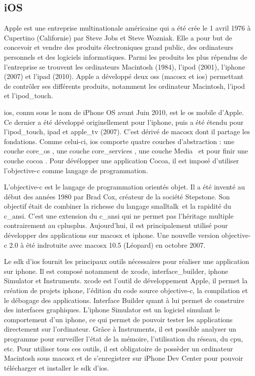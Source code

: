 \subsection{iOS}
	Apple est une entreprise multinationale américaine qui a été crée le 1
	avril 1976 à Cupertino (Californie) par Steve Jobs et Steve Wozniak. Elle a
	pour but de concevoir et vendre des produits électroniques grand public, des
	ordinateurs personnels et des logiciels informatiques. Parmi les produits les
	plus répendus de l'entreprise se trouvent les ordinateurs Macintosh (1984),
	l'\gls{ipod} (2001), l'\gls{iphone} (2007) et l'\gls{ipad} (2010). Apple a
	développé deux \glspl{os} (\gls{macosx} et \gls{ios})
	permettant de contrôler ses différents produits, notamment les ordinateur 
	Macintosh, l'\gls{ipod} et l'\gls{ipod_touch}.
			
	\gls{ios}, connu sous le nom de iPhone OS avant Juin 2010, est le \gls{os} 
	mobile d'Apple. Ce dernier a été développé originellement pour l'\gls{iphone}, puis a été étendu pour l'\gls{ipod_touch}, \gls{ipad} et
	\gls{apple_tv} (2007). C'est dérivé de \gls{macosx}  dont il partage les 
	fondations. Comme celui-ci, \gls{ios} comporte quatre couches d'abstraction : une
	couche \og \gls{core_os} \fg, une couche \og \gls{core_services} \fg, une
	couche \og Media \fg \, et pour finir une couche \og \gls{cocoa} \fg. Pour
	dévélopper une application Cocoa, il est imposé d'utiliser l'\gls{objective-c} comme
	langage de programmation.
			
	L'\gls{objective-c} est le langage de programmation orientés objet. Il a été inventé
	au début des années 1980 par Brad Cox, créateur de la société Stepstone. Son
	objectif était de combiner la richesse du langage \gls{smalltalk}\, et la
	rapidité du \gls{c_ansi}. 
	C'est une extension du \gls{c_ansi} qui ne permet pas l'héritage multiple
	contrairement au \gls{cplusplus}. Aujourd'hui, il est principalement utilisé
	pour développer des applications sur \gls{macosx} et \gls{iphone}. Une nouvelle version
	\gls{objective-c} 2.0 à été indrotuite avec \gls{macosx} 10.5 (Léopard) en octobre 2007.
			
	Le \gls{sdk} d'\gls{ios} fournit les principaux outils nécessaires pour
	réaliser une application sur \gls{iphone}. Il est composé notamment de \gls{xcode},
	\gls{interface_builder}, \gls{iphone} Simulator et Instruments. \gls{xcode} est l'outil de
	développement Apple, il permet la création de projets \gls{iphone}, l’édition du code
	source \gls{objective-c}, la compilation et le débogage des applications. Interface
	Builder quant à lui permet de construire des interfaces graphiques. L'\gls{iphone}
	Simulator est un logiciel simulant le comportement d'un \gls{iphone}, ce qui 
	permet de pouvoir tester les applications directement sur l'ordinateur. Grâce
	à Instruments, il est possible analyser un programme pour surveiller l’état de la
	mémoire, l’utilisation du réseau, du \gls{cpu}, etc. Pour utiliser tous ces outils,
	il est obligatoire de possèder un ordinateur Macintosh sous \gls{macosx} et de
	s'enregistrer sur iPhone Dev Center pour pouvoir télécharger et installer le
	\gls{sdk} d'\gls{ios}.
